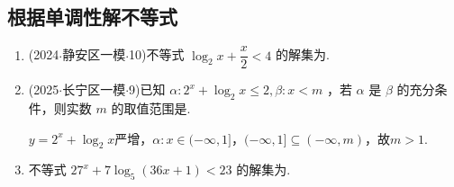 \subsection*{根据单调性解不等式}
\begin{enumerate}
    \item (2024$\cdot$静安区一模$\cdot$10)不等式 ${\log }_{2}x + \dfrac{x}{2} < 4$ 的解集为.
    
    \item (2025$\cdot$长宁区一模$\cdot$9)已知 $\alpha  : {2}^{x} + {\log }_{2}x \leq  2,\beta  : x < m$ ，若 $\alpha$ 是 $\beta$ 的充分条件，则实数 $m$ 的取值范围是.
    \begin{jieda}
        $y = {2}^{x} + {\log }_{2}x$严增，$\alpha : x \in (-\infty, 1]$，$(-\infty, 1] \subseteq (-\infty, m)$，故$m > 1$.
    \end{jieda}

    \item 不等式 ${27}^{x} + 7{\log }_{5}\left( {{36x} + 1}\right)  < {23}$ 的解集为.
\end{enumerate}


